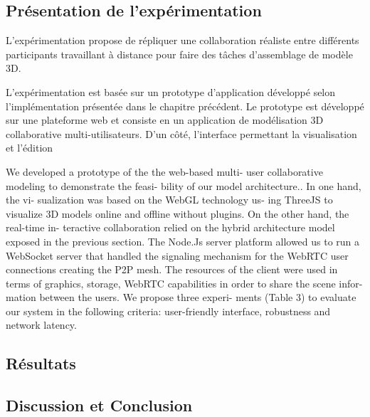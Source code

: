 
\subsection{Présentation de l'expérimentation}

 L'expérimentation propose de répliquer une collaboration réaliste entre 
différents participants travaillant à distance pour faire des tâches d'assemblage de 
modèle 3D.

L'expérimentation est basée sur un prototype d'application développé selon 
l'implémentation présentée dans le chapitre précédent.
Le prototype est développé sur une plateforme web et consiste en un application 
de modélisation 3D collaborative multi-utilisateurs. 
D'un côté, l'interface permettant la visualisation et l'édition 

We developed a prototype of the the web-based multi- user collaborative modeling 
to demonstrate the feasi- bility of our model architecture.. In one hand, the vi- 
sualization was based on the WebGL technology us- ing ThreeJS to visualize 3D 
models online and offline without plugins. On the other hand, the real-time in- 
teractive collaboration relied on the hybrid architecture model exposed in the 
previous section. The Node.Js server platform allowed us to run a WebSocket 
server that handled the signaling mechanism for the WebRTC user connections 
creating the P2P mesh. The resources of the client were used in terms of 
graphics, storage, WebRTC capabilities in order to share the scene infor- mation 
between the users. We propose three experi- ments (Table 3) to evaluate our 
system in the following criteria: user-friendly interface, robustness and network 
latency.



\subsection{Résultats}
\subsection{Discussion et Conclusion}